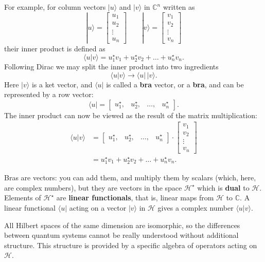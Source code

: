 \documentclass[fleqn]{article}
\newenvironment{idea}{\noindent}{\medskip}
\begin{document}
For example, for column vectors \(|u\rangle\) and \(|v\rangle\) in \(\mathbb{C}^n\) written as
\[
  |u\rangle
  = \begin{bmatrix}u_1\\u_2\\\vdots\\u_n\end{bmatrix}
  \qquad
  |v\rangle
  = \begin{bmatrix}v_1\\v_2\\\vdots\\v_n\end{bmatrix}
\]
their inner product is defined as
\[
  \langle u|v\rangle
  = u_1^\star v_1 + u_2^\star v_2+\ldots + u_n^\star v_n.
\]
Following Dirac we may split the inner product into two ingredients
\[
  \langle u|v\rangle
  \longrightarrow \langle u|\,|v\rangle.
\]
Here \(|v\rangle\) is a ket vector, and \(\langle u|\) is called a \textbf{bra} vector, or a \textbf{bra}, and can be represented by a row vector:
\[
  \langle u|
  = \begin{bmatrix}u_1^\star,&u_2^\star,&\ldots,&u_n^\star\end{bmatrix}.
\]
The inner product can now be viewed as the result of the matrix multiplication:
\[
  \begin{aligned}
    \langle u|v\rangle
    &= \begin{bmatrix}u_1^\star,&u_2^\star,&\ldots,&u_n^\star\end{bmatrix}
    \cdot \begin{bmatrix}v_1\\v_2\\\vdots\\v_n\end{bmatrix}
  \\&= u_1^\star v_1 + u_2^\star v_2 + \ldots + u_n^\star v_n.
  \end{aligned}
\]

Bras are vectors: you can add them, and multiply them by scalars (which, here, are complex numbers), but they are vectors in the space \({\mathcal{H}}^\star\) which is \textbf{dual} to \(\mathcal{H}\).
Elements of \({\mathcal{H}}^\star\) are \textbf{linear functionals}, that is, linear maps from \(\mathcal{H}\) to \(\mathbb{C}\).
A linear functional \(\langle u|\) acting on a vector \(|v\rangle\) in \(\mathcal{H}\) gives a complex number \(\langle u|v\rangle\).

\begin{idea}
All Hilbert spaces of the same dimension are isomorphic, so the differences between quantum systems cannot be really understood without additional structure. This structure is provided by a specific algebra of operators acting on \(\mathcal{H}\).

\end{idea}
\end{document}
